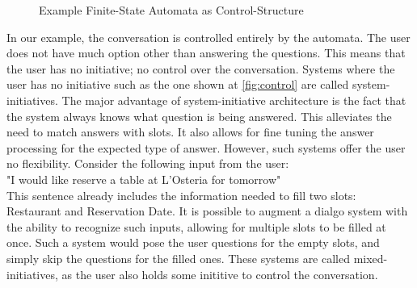 \usetikzlibrary{automata,positioning}
\begin{figure}[htbp]
  \centering
  \caption[Example Finite-State Automata as Control-Structure]{Example Finite-State Automata as Control-Structure}\label{fig:control}
\end{figure}

In our example, the conversation is controlled entirely by the automata.
The user does not have much option other than answering the questions.
This means that the user has no initiative; no control over the conversation.
Systems where the user has no initiative such as the one shown at \autoref{fig:control} are called system-initiatives.
The major advantage of system-initiative architecture is the fact that the system always knows what question is being answered.
This alleviates the need to match answers with slots.
It also allows for fine tuning the answer processing for the expected type of answer.
However, such systems offer the user no flexibility.
Consider the following input from the user:\\
"I would like reserve a table at L'Osteria for tomorrow"\\
This sentence already includes the information needed to fill two slots: Restaurant and Reservation Date.
It is possible to augment a dialgo system with the ability to recognize such inputs, allowing for multiple slots to be filled at once.
Such a system would pose the user questions for the empty slots, and simply skip the questions for the filled ones.
These systems are called mixed-initiatives, as the user also holds some inititive to control the conversation.
\newpage

